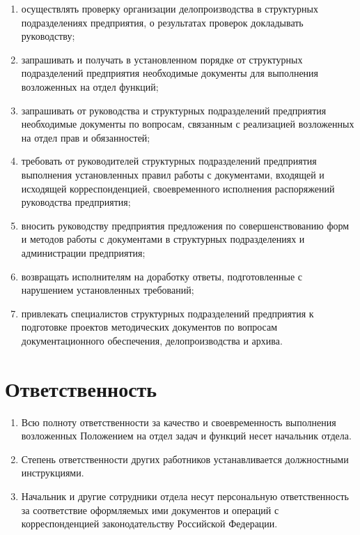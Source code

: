 \documentclass[a4paper,12pt]{article}
\begin{document}
\begin{enumerate}
	\item осуществлять проверку организации делопроизводства в структурных подразделениях предприятия, о результатах проверок докладывать руководству;
	
	\item запрашивать и получать в установленном порядке от структурных подразделений предприятия необходимые документы для выполнения возложенных на отдел функций;
	
	\item запрашивать от руководства и структурных подразделений предприятия необходимые документы по вопросам, связанным с реализацией возложенных на отдел прав и обязанностей;
	
	\item требовать от руководителей структурных подразделений предприятия выполнения установленных правил работы с документами, входящей и исходящей корреспонденцией, своевременного исполнения распоряжений руководства предприятия;
	
	\item вносить руководству предприятия предложения по совершенствованию форм и методов работы с документами в структурных подразделениях и администрации предприятия;
	
	\item возвращать исполнителям на доработку ответы, подготовленные с нарушением установленных требований;
	
	\item привлекать специалистов структурных подразделений предприятия к подготовке проектов методических документов по вопросам документационного обеспечения, делопроизводства и архива.
\end{enumerate}

\section{Ответственность}

\begin{enumerate}
	\item Всю полноту ответственности за качество и своевременность выполнения возложенных Положением на отдел задач и функций несет начальник отдела.
	
	\item Степень ответственности других работников устанавливается должностными инструкциями.
	
	\item Начальник и другие сотрудники отдела несут персональную ответственность за соответствие оформляемых ими документов и операций с корреспонденцией законодательству Российской Федерации.
\end{enumerate}
\end{document}
